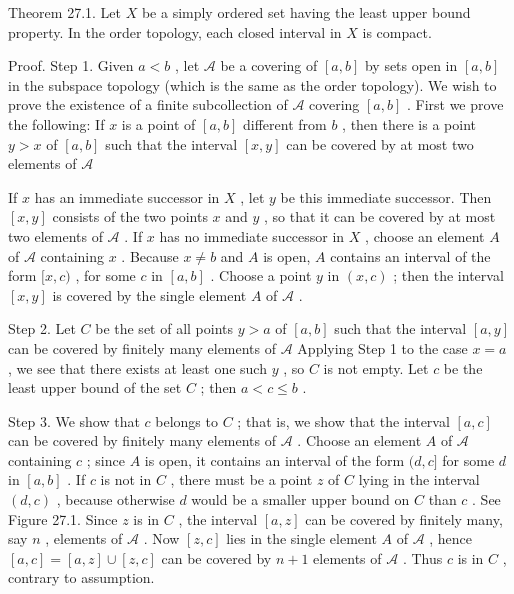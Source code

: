 \documentclass[10pt]{article}
\begin{document}
Theorem 27.1. Let \(X\) be a simply ordered set having the least upper bound property. In the order topology, each closed interval in \(X\) is compact.

Proof. Step 1. Given \(a < b\) , let \(\mathcal{A}\) be a covering of \(\left\lbrack  {a,b}\right\rbrack\) by sets open in \(\left\lbrack  {a,b}\right\rbrack\) in the subspace topology (which is the same as the order topology). We wish to prove the existence of a finite subcollection of \(\mathcal{A}\) covering \(\left\lbrack  {a,b}\right\rbrack\) . First we prove the following: If \(x\) is a point of \(\left\lbrack  {a,b}\right\rbrack\) different from \(b\) , then there is a point \(y > x\) of \(\left\lbrack  {a,b}\right\rbrack\) such that the interval \(\left\lbrack  {x,y}\right\rbrack\) can be covered by at most two elements of \(\mathcal{A}\)

If \(x\) has an immediate successor in \(X\) , let \(y\) be this immediate successor. Then \(\left\lbrack  {x,y}\right\rbrack\) consists of the two points \(x\) and \(y\) , so that it can be covered by at most two elements of \(\mathcal{A}\) . If \(x\) has no immediate successor in \(X\) , choose an element \(A\) of \(\mathcal{A}\) containing \(x\) . Because \(x \neq  b\) and \(A\) is open, \(A\) contains an interval of the form \(\lbrack x,c)\) , for some \(c\) in \(\left\lbrack  {a,b}\right\rbrack\) . Choose a point \(y\) in \(\left( {x,c}\right)\) ; then the interval \(\left\lbrack  {x,y}\right\rbrack\) is covered by the single element \(A\) of \(\mathcal{A}\) .

Step 2. Let \(C\) be the set of all points \(y > a\) of \(\left\lbrack  {a,b}\right\rbrack\) such that the interval \(\left\lbrack  {a,y}\right\rbrack\) can be covered by finitely many elements of \(\mathcal{A}\) Applying Step 1 to the case \(x = a\) , we see that there exists at least one such \(y\) , so \(C\) is not empty. Let \(c\) be the least upper bound of the set \(C\) ; then \(a < c \leq  b\) .

Step 3. We show that \(c\) belongs to \(C\) ; that is, we show that the interval \(\left\lbrack  {a,c}\right\rbrack\) can be covered by finitely many elements of \(\mathcal{A}\) . Choose an element \(A\) of \(\mathcal{A}\) containing \(c\) ; since \(A\) is open, it contains an interval of the form \((d,c\rbrack\) for some \(d\) in \(\left\lbrack  {a,b}\right\rbrack\) . If \(c\) is not in \(C\) , there must be a point \(z\) of \(C\) lying in the interval \(\left( {d,c}\right)\) , because otherwise \(d\) would be a smaller upper bound on \(C\) than \(c\) . See Figure 27.1. Since \(z\) is in \(C\) , the interval \(\left\lbrack  {a,z}\right\rbrack\) can be covered by finitely many, say \(n\) , elements of \(\mathcal{A}\) . Now \(\left\lbrack  {z,c}\right\rbrack\) lies in the single element \(A\) of \(\mathcal{A}\) , hence \(\left\lbrack  {a,c}\right\rbrack   = \left\lbrack  {a,z}\right\rbrack   \cup  \left\lbrack  {z,c}\right\rbrack\) can be covered by \(n + 1\) elements of \(\mathcal{A}\) . Thus \(c\) is in \(C\) , contrary to assumption.
\end{document}

